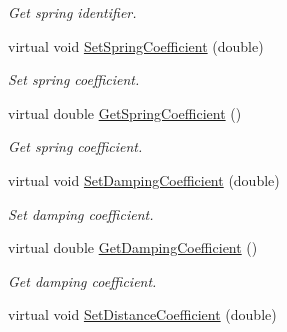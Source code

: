 \begin{DoxyCompactItemize}
\begin{DoxyCompactList}\small\item\em Get spring identifier. \item\end{DoxyCompactList}\item 
\hypertarget{classvtkSpring_ab80b979ea5e9d0feb4634bfc9d63a36f}{
virtual void \hyperlink{classvtkSpring_ab80b979ea5e9d0feb4634bfc9d63a36f}{SetSpringCoefficient} (double)}
\label{classvtkSpring_ab80b979ea5e9d0feb4634bfc9d63a36f}

\begin{DoxyCompactList}\small\item\em Set spring coefficient. \item\end{DoxyCompactList}\item 
\hypertarget{classvtkSpring_adfe4f2c8ffa69c2a78f70f5dafe28654}{
virtual double \hyperlink{classvtkSpring_adfe4f2c8ffa69c2a78f70f5dafe28654}{GetSpringCoefficient} ()}
\label{classvtkSpring_adfe4f2c8ffa69c2a78f70f5dafe28654}

\begin{DoxyCompactList}\small\item\em Get spring coefficient. \item\end{DoxyCompactList}\item 
\hypertarget{classvtkSpring_a84166075d8f3babcc76f94872484be05}{
virtual void \hyperlink{classvtkSpring_a84166075d8f3babcc76f94872484be05}{SetDampingCoefficient} (double)}
\label{classvtkSpring_a84166075d8f3babcc76f94872484be05}

\begin{DoxyCompactList}\small\item\em Set damping coefficient. \item\end{DoxyCompactList}\item 
\hypertarget{classvtkSpring_a8d1c2b7f7d027be0d76f4a84dbfaea1b}{
virtual double \hyperlink{classvtkSpring_a8d1c2b7f7d027be0d76f4a84dbfaea1b}{GetDampingCoefficient} ()}
\label{classvtkSpring_a8d1c2b7f7d027be0d76f4a84dbfaea1b}

\begin{DoxyCompactList}\small\item\em Get damping coefficient. \item\end{DoxyCompactList}\item 
\hypertarget{classvtkSpring_a42c15433e88f2d814c548c3ce787f14c}{
virtual void \hyperlink{classvtkSpring_a42c15433e88f2d814c548c3ce787f14c}{SetDistanceCoefficient} (double)}
\label{classvtkSpring_a42c15433e88f2d814c548c3ce787f14c}


\end{DoxyCompactItemize}
